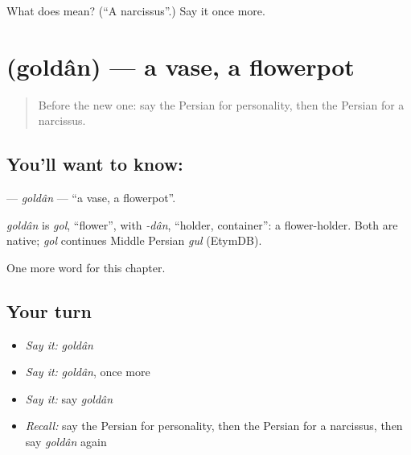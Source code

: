 \begin{tcolorbox}[breakable,colback=teal!4,colframe=teal!35!black,title={Before you move on}]
What does  mean? (\textquotedblleft{}A narcissus\textquotedblright{}.) Say it once more.
\end{tcolorbox}
\section[\texorpdfstring{\fa{گلدان} (goldân)}{گلدان (goldân)}]{ (goldân) — a vase, a flowerpot}

\label{lesson:FA-C171-goldan}



\begin{quote}
Before the new one: say the Persian for personality, then the Persian for a narcissus.
\end{quote}

\subsection*{You'll want to know: }
\textbf{} — \emph{goldân} — \textquotedblleft{}a vase, a flowerpot\textquotedblright{}.

\begin{cousinweb}
\emph{goldân} is \emph{gol}, \textquotedblleft{}flower\textquotedblright{}, with \emph{-dân}, \textquotedblleft{}holder, container\textquotedblright{}: a flower-holder. Both are native; \emph{gol} continues Middle Persian \emph{gul} (EtymDB).
\end{cousinweb}

\begin{grammarlens}[title={What you've built}]
One more word for this chapter.
\end{grammarlens}

\subsection*{Your turn}
\begin{itemize}
\raggedright
  \item \emph{Say it:} \emph{goldân}
  \item \emph{Say it:} \emph{goldân}, once more
  \item \emph{Say it:} say \emph{goldân}
  \item \emph{Recall:} say the Persian for personality, then the Persian for a narcissus, then say \emph{goldân} again
\end{itemize}

